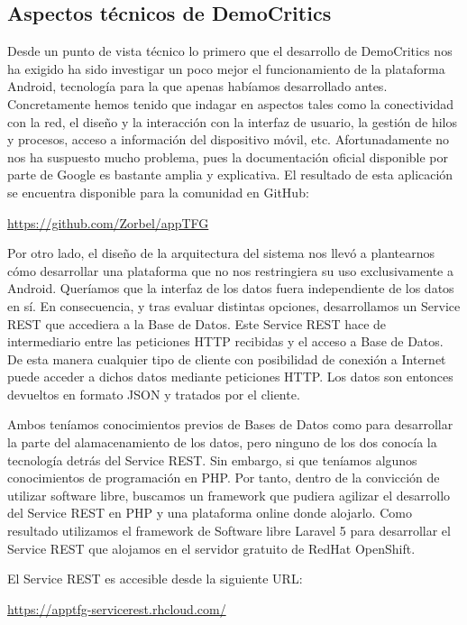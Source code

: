 \subsection{Aspectos técnicos de DemoCritics}

Desde un punto de vista técnico lo primero que el desarrollo de DemoCritics nos ha exigido ha sido investigar un poco mejor el funcionamiento de la plataforma Android, tecnología para la que apenas habíamos desarrollado antes. Concretamente hemos tenido que indagar en aspectos tales como la conectividad con la red, el diseño y la interacción con la interfaz de usuario, la gestión de hilos y procesos, acceso a información del dispositivo móvil, etc. Afortunadamente no nos ha suspuesto mucho problema, pues la documentación oficial disponible por parte de Google es bastante amplia y explicativa. El resultado de esta aplicación se encuentra disponible para la comunidad en GitHub:

\url{https://github.com/Zorbel/appTFG}

Por otro lado, el diseño de la arquitectura del sistema nos llevó a plantearnos cómo desarrollar una plataforma que no nos restringiera su uso exclusivamente a Android. Queríamos que la interfaz de los datos fuera independiente de los datos en sí. En consecuencia, y tras evaluar distintas opciones, desarrollamos un Service REST que accediera a la Base de Datos. Este Service REST hace de intermediario entre las peticiones HTTP recibidas y el acceso a Base de Datos. De esta manera cualquier tipo de cliente con posibilidad de conexión a Internet puede acceder a dichos datos mediante peticiones HTTP. Los datos son entonces devueltos en formato JSON y tratados por el cliente.

Ambos teníamos conocimientos previos de Bases de Datos como para desarrollar la parte del alamacenamiento de los datos, pero ninguno de los dos conocía la tecnología detrás del Service REST. Sin embargo, si que teníamos algunos conocimientos de programación en PHP. Por tanto, dentro de la convicción de utilizar software libre, buscamos un framework que pudiera agilizar el desarrollo del Service REST en PHP y una plataforma online donde alojarlo. Como resultado utilizamos el framework de Software libre Laravel 5 para desarrollar el Service REST que alojamos en el servidor gratuito de RedHat OpenShift. 

El Service REST es accesible desde la siguiente URL:

\url{https://apptfg-servicerest.rhcloud.com/}

